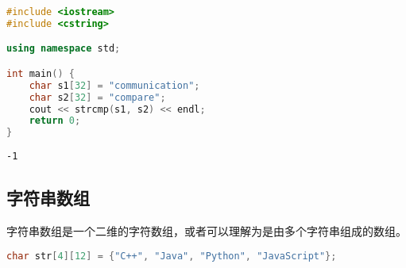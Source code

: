 \begin{lstlisting}[language=C++]
#include <iostream>
#include <cstring>

using namespace std;

int main() {
	char s1[32] = "communication";
	char s2[32] = "compare";
	cout << strcmp(s1, s2) << endl;
	return 0;
}
\end{lstlisting}

\begin{tcolorbox}
	\begin{verbatim}
-1
	\end{verbatim}
\end{tcolorbox}

\vspace{0.5cm}

\subsection{字符串数组}

字符串数组是一个二维的字符数组，或者可以理解为是由多个字符串组成的数组。

\vspace{-0.5cm}

\begin{lstlisting}[language=C++]
char str[4][12] = {"C++", "Java", "Python", "JavaScript"};
\end{lstlisting}

\begin{table}[H]
	\centering
\end{table}

